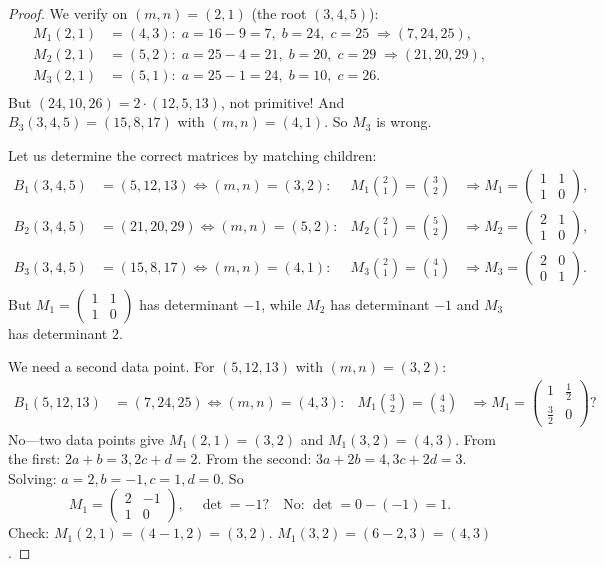 \documentclass[12pt]{amsart}
\theoremstyle{definition}
\theoremstyle{remark}
\begin{document}
\begin{proof}
We verify on $(m,n)=(2,1)$ (the root $(3,4,5)$):
\begin{align*}
  M_1(2,1) &= (4,3): \; a=16-9=7,\; b=24,\; c=25 \;\Rightarrow (7,24,25), \\
  M_2(2,1) &= (5,2): \; a=25-4=21,\; b=20,\; c=29 \;\Rightarrow (21,20,29), \\
  M_3(2,1) &= (5,1): \; a=25-1=24,\; b=10,\; c=26. \\
\end{align*}
But $(24,10,26) = 2\cdot(12,5,13)$, not primitive!  And $B_3(3,4,5) = (15,8,17)$
with $(m,n)=(4,1)$.  So $M_3$ is wrong.

Let us determine the correct matrices by matching children:
\begin{align*}
  B_1(3,4,5) &= (5,12,13) \Leftrightarrow (m,n)=(3,2):
    &M_1\binom{2}{1} = \binom{3}{2}
    &\Rightarrow M_1 = \begin{pmatrix}1&1\\1&0\end{pmatrix}, \\
  B_2(3,4,5) &= (21,20,29) \Leftrightarrow (m,n)=(5,2):
    &M_2\binom{2}{1} = \binom{5}{2}
    &\Rightarrow M_2 = \begin{pmatrix}2&1\\1&0\end{pmatrix}, \\
  B_3(3,4,5) &= (15,8,17) \Leftrightarrow (m,n)=(4,1):
    &M_3\binom{2}{1} = \binom{4}{1}
    &\Rightarrow M_3 = \begin{pmatrix}2&0\\0&1\end{pmatrix}.
\end{align*}
But $M_1 = \left(\begin{smallmatrix}1&1\\1&0\end{smallmatrix}\right)$ has determinant $-1$, while $M_2$ has determinant $-1$ and $M_3$ has
determinant $2$.

We need a second data point.  For $(5,12,13)$ with $(m,n)=(3,2)$:
\begin{align*}
  B_1(5,12,13) &= (7,24,25) \Leftrightarrow (m,n)=(4,3):
    &M_1\binom{3}{2} = \binom{4}{3}
    &\Rightarrow M_1 = \begin{pmatrix}1&\frac{1}{2}\\\frac{3}{2}&0\end{pmatrix}?
\end{align*}
No---two data points give $M_1(2,1)=(3,2)$ and $M_1(3,2)=(4,3)$.
From the first: $2a+b=3, 2c+d=2$.  From the second: $3a+2b=4, 3c+2d=3$.
Solving: $a=2, b=-1, c=1, d=0$.  So
\begin{equation}
  M_1 = \begin{pmatrix}2&-1\\1&0\end{pmatrix}, \quad\det=-1? \quad
  \text{No: } \det = 0-(-1)=1.
\end{equation}
Check: $M_1(2,1)=(4-1,2)=(3,2)$. \checkmark\quad
$M_1(3,2)=(6-2,3)=(4,3)$. \checkmark


\end{proof}
\end{document}
